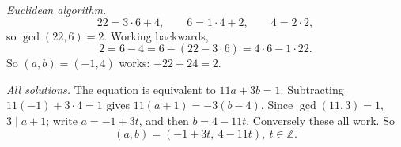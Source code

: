 \emph{Euclidean algorithm.}
\[22=3\cdot6+4,\qquad6=1\cdot4+2,\qquad4=2\cdot2,\]
so $\gcd(22,6)=2$. Working backwards,
\[2=6-4=6-(22-3\cdot6)=4\cdot6-1\cdot22.\]
So $(a,b)=(-1,4)$ works: $-22+24=2$.

\emph{All solutions.} The equation is equivalent to $11a+3b=1$. Subtracting $11(-1)+3\cdot4=1$ gives $11(a+1)=-3(b-4)$. Since $\gcd(11,3)=1$, $3\mid a+1$; write $a=-1+3t$, and then $b=4-11t$. Conversely these all work. So
\[\boxed{(a,b)=(-1+3t,\ 4-11t),\ t\in\mathbb Z}.\]
